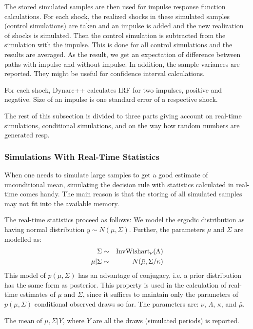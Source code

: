 \documentclass[10pt]{article}
\begin{document}
The stored simulated samples are then used for impulse response
function calculations. For each shock, the realized shocks in these
simulated samples (control simulations) are taken and an impulse is
added and the new realization of shocks is simulated. Then the control
simulation is subtracted from the simulation with the impulse. This is
done for all control simulations and the results are averaged. As the
result, we get an expectation of difference between paths with impulse
and without impulse. In addition, the sample variances are
reported. They might be useful for confidence interval calculations.

For each shock, Dynare++ calculates IRF for two impulses, positive and
negative. Size of an impulse is one standard error of a respective
shock.

The rest of this subsection is divided to three parts giving account
on real-time simulations, conditional simulations, and on the way how
random numbers are generated resp.

\subsubsection{Simulations With Real-Time Statistics}
\label{rt_simul}

When one needs to simulate large samples to get a good estimate of
unconditional mean, simulating the decision rule with statistics
calculated in real-time comes handy. The main reason is that the
storing of all simulated samples may not fit into the available
memory.

The real-time statistics proceed as follows: We model the ergodic
distribution as having normal distribution $y\sim N(\mu,\Sigma)$. Further,
the parameters $\mu$ and $\Sigma$ are modelled as:
\begin{eqnarray*}
  \Sigma &\sim& {\rm InvWishart}_\nu(\Lambda)\\
  \mu|\Sigma &\sim& N(\bar\mu,\Sigma/\kappa) \\ 
\end{eqnarray*}
This model of $p(\mu,\Sigma)$ has an advantage of conjugacy, i.e. a
prior distribution has the same form as posterior. This property is
used in the calculation of real-time estimates of $\mu$ and $\Sigma$,
since it suffices to maintain only the parameters of $p(\mu,\Sigma)$
conditional observed draws so far. The parameters are: $\nu$,
$\Lambda$, $\kappa$, and $\bar\mu$.

The mean of $\mu,\Sigma|Y$, where $Y$ are all the draws (simulated
periods) is reported.
\end{document}
